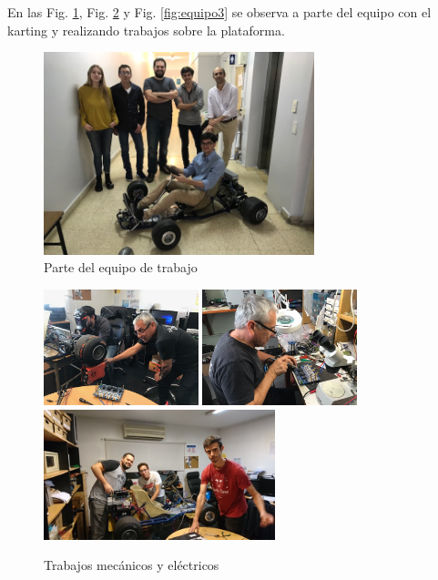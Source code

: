 \documentclass[a4paper]{article}
\begin{document}
En las Fig. \ref{fig:equipo1}, Fig. \ref{fig:equipo2} y Fig. \ref{fig:equipo3} se observa a parte del equipo con el karting y realizando trabajos sobre la plataforma.
%
\begin{figure}[h]
    \centering
    \includegraphics[width=0.7\textwidth]{figs/equipo1.jpg}
    \caption{Parte del equipo de trabajo}
    \label{fig:equipo1}
\end{figure}
%
\begin{figure}[h]
    \centering
    \includegraphics[width=0.4\textwidth]{figs/equipo2.jpg}
    \includegraphics[width=0.4\textwidth]{figs/equipo3.jpg}
    \includegraphics[width=0.6\textwidth]{figs/equipo4.jpg}
    \caption{Trabajos mecánicos y eléctricos}
    \label{fig:equipo2}
\end{figure}
\end{document}
